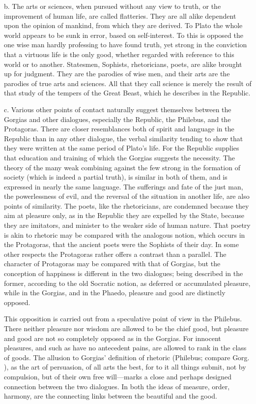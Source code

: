 \documentclass[11pt,letter]{article}
\begin{document}
\par  b. The arts or sciences, when pursued without any view to truth, or the improvement of human life, are called flatteries. They are all alike dependent upon the opinion of mankind, from which they are derived. To Plato the whole world appears to be sunk in error, based on self-interest. To this is opposed the one wise man hardly professing to have found truth, yet strong in the conviction that a virtuous life is the only good, whether regarded with reference to this world or to another. Statesmen, Sophists, rhetoricians, poets, are alike brought up for judgment. They are the parodies of wise men, and their arts are the parodies of true arts and sciences. All that they call science is merely the result of that study of the tempers of the Great Beast, which he describes in the Republic.

\par  c. Various other points of contact naturally suggest themselves between the Gorgias and other dialogues, especially the Republic, the Philebus, and the Protagoras. There are closer resemblances both of spirit and language in the Republic than in any other dialogue, the verbal similarity tending to show that they were written at the same period of Plato’s life. For the Republic supplies that education and training of which the Gorgias suggests the necessity. The theory of the many weak combining against the few strong in the formation of society (which is indeed a partial truth), is similar in both of them, and is expressed in nearly the same language. The sufferings and fate of the just man, the powerlessness of evil, and the reversal of the situation in another life, are also points of similarity. The poets, like the rhetoricians, are condemned because they aim at pleasure only, as in the Republic they are expelled by the State, because they are imitators, and minister to the weaker side of human nature. That poetry is akin to rhetoric may be compared with the analogous notion, which occurs in the Protagoras, that the ancient poets were the Sophists of their day. In some other respects the Protagoras rather offers a contrast than a parallel. The character of Protagoras may be compared with that of Gorgias, but the conception of happiness is different in the two dialogues; being described in the former, according to the old Socratic notion, as deferred or accumulated pleasure, while in the Gorgias, and in the Phaedo, pleasure and good are distinctly opposed.

\par  This opposition is carried out from a speculative point of view in the Philebus. There neither pleasure nor wisdom are allowed to be the chief good, but pleasure and good are not so completely opposed as in the Gorgias. For innocent pleasures, and such as have no antecedent pains, are allowed to rank in the class of goods. The allusion to Gorgias’ definition of rhetoric (Philebus; compare Gorg. ), as the art of persuasion, of all arts the best, for to it all things submit, not by compulsion, but of their own free will—marks a close and perhaps designed connection between the two dialogues. In both the ideas of measure, order, harmony, are the connecting links between the beautiful and the good.
\end{document}
